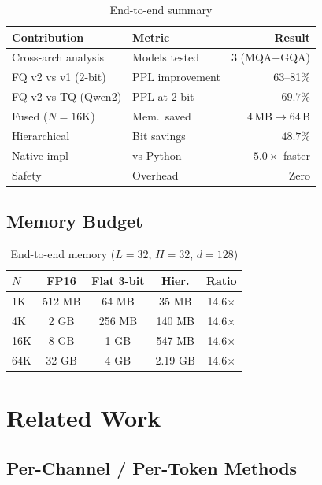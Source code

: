 \documentclass[10pt,twocolumn]{article}
\begin{document}
\begin{table}[t]
\centering
\small
\caption{End-to-end summary}
\label{tab:e2e}
\setlength{\tabcolsep}{4pt}
\begin{tabular}{llr}
\toprule
Contribution & Metric & Result \\
\midrule
Cross-arch analysis & Models tested & 3 (MQA+GQA) \\
FQ v2 vs v1 (2-bit) & PPL improvement & 63--81\% \\
FQ v2 vs TQ (Qwen2) & PPL at 2-bit & $\mathbf{-69.7\%}$ \\
Fused ($N{=}16$K) & Mem.\ saved & 4\,MB$\to$64\,B \\
Hierarchical & Bit savings & $\mathbf{48.7\%}$ \\
Native impl & vs Python & $\mathbf{5.0\times}$ faster \\
Safety & Overhead & Zero \\
\bottomrule
\end{tabular}
\end{table}

\subsection{Memory Budget}

\begin{table}[t]
\centering
\small
\caption{End-to-end memory ($L{=}32$, $H{=}32$, $d{=}128$)}
\label{tab:memory_e2e}
\setlength{\tabcolsep}{4pt}
\begin{tabular}{lcccc}
\toprule
$N$ & FP16 & Flat 3-bit & Hier. & Ratio \\
\midrule
1K & 512 MB & 64 MB & 35 MB & 14.6$\times$ \\
4K & 2 GB & 256 MB & 140 MB & 14.6$\times$ \\
16K & 8 GB & 1 GB & 547 MB & 14.6$\times$ \\
64K & 32 GB & 4 GB & 2.19 GB & 14.6$\times$ \\
\bottomrule
\end{tabular}
\end{table}

\section{Related Work}

\subsection{Per-Channel / Per-Token Methods}
\end{document}

